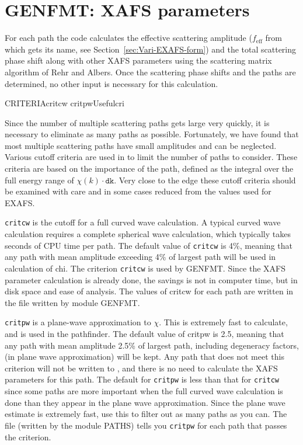 \documentclass[11pt,oneside]{report} %
\begin{document}
\section{GENFMT: XAFS parameters}
\label{sec:Calc-contr-from}

For each path the code calculates the effective scattering amplitude
($f_{\mathrm{eff}}$ from which {\feff} gets its name, see
Section~\ref{sec:Vari-EXAFS-form}) and the total scattering phase
shift along with other XAFS parameters using the scattering matrix
algorithm of Rehr and Albers.  Once the scattering phase shifts and
the paths are determined, no other input is necessary for this
calculation.


\begin{Card}{CRITERIA}{critcw critpw}{Useful}{cri}

  Since the number of multiple scattering paths gets large very
  quickly, it is necessary to eliminate as many paths as possible.
  Fortunately, we have found that most multiple scattering paths have
  small amplitudes and can be neglected.  Various cutoff criteria
  are used in {\feffcur} to limit the number of paths to consider.  These
  criteria are based on the importance of the path, defined as the
  integral over the full energy range of $\chi(k)\cdot\mathtt{dk}$.
  Very close to the edge these cutoff criteria should be examined
 with care and in some cases reduced from the values used for EXAFS.

  \texttt{critcw} is the cutoff for a full curved wave calculation.  A
  typical curved wave calculation requires a complete spherical wave
  calculation, which typically takes seconds of CPU time per path.
  The default value of \texttt{critcw} is 4\%, meaning that any path
  with mean amplitude exceeding 4\% of largest path will be used in
  calculation of chi. The criterion \texttt{critcw} is used by GENFMT.
  Since the XAFS parameter calculation is already done, the savings is
  not in computer time, but in disk space and ease of analysis.  The
  values of critcw for each path are written in the file 
  written by module GENFMT.

  \texttt{critpw} is a plane-wave approximation to $\chi$.  This is
  extremely fast to calculate, and is used in the pathfinder.  The
  default value of critpw is 2.5, meaning that any path with mean
  amplitude 2.5\% of largest path, including degeneracy factors, (in
  plane wave approximation) will be kept. Any path that does not meet
  this criterion will not be written to , and there
  is no need to calculate the XAFS parameters for this path.  The
  default for \texttt{critpw} is less than that for \texttt{critcw}
  since some paths are more important when the full curved wave
  calculation is done than they appear in the plane wave
  approximation.  Since the plane wave estimate is extremely fast, use
  this to filter out as many paths as you can.  The file
   (written by the module PATHS) tells you
  \texttt{critpw} for each path that passes the criterion.


\end{Card}
\end{document}
